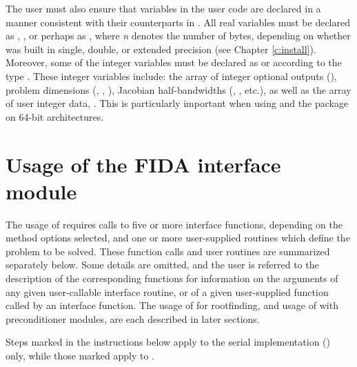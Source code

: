 The user must also ensure that variables in the user {\F} code are
declared in a manner consistent with their counterparts in {\ida}.
All real variables must be declared as , ,
or perhaps as , where {\em n} denotes the number of bytes,
depending on whether {\ida} was built in single, double, or extended precision 
(see Chapter \ref{c:install}). Moreover, some of the {\F} integer variables
must be declared as  or  according to the 
{\C} type . These integer variables include: the array of
integer optional outputs (), problem dimensions (,
, ), Jacobian half-bandwidths (, , etc.),
as well as the array of user integer data, .
This is particularly important when using {\ida} and the {\fida}
package on 64-bit architectures.

\section{Usage of the FIDA interface module}\label{ss:fida_usage}

The usage of {\fida} requires calls to five or more interface
functions, depending on the method options selected, and one or more
user-supplied routines which define the problem to be solved.  These
function calls and user routines are summarized separately below.
Some details are omitted, and the user is referred to the description
of the corresponding {\ida} functions for information on the arguments 
of any given user-callable interface routine, or of a given user-supplied 
function called by an interface function.
The usage of {\fida} for rootfinding, and usage of {\fida} with
preconditioner modules, are each described in later sections.

Steps marked {\s} in the instructions below apply to the serial
{\nvector} implementation ({\nvecs}) only, while those marked {\p}
apply to {\nvecp}.

